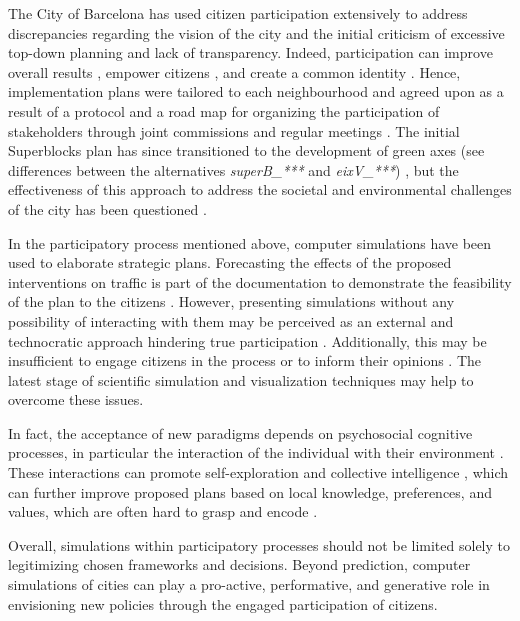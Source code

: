 The City of Barcelona has used citizen participation extensively to address discrepancies regarding the vision of the city and the initial criticism of excessive top-down planning and lack of transparency. Indeed, participation can improve overall results \citep{Washburn2013}, empower citizens \citep{Speer2001}, and create a common identity \citep{Campbell2000}. Hence, implementation plans were tailored to each neighbourhood and agreed upon as a result of a protocol and a road map for organizing the participation of stakeholders through joint commissions and regular meetings \citep{AjuntamentdeBarcelona2020implementingSuperblocks}. The initial Superblocks plan has since transitioned to the development of green axes (see differences between the alternatives \emph{superB\_***} and \emph{eixV\_***}) \citep{AjuntamentdeBarcelona2021SUPERBLOCKBCN}, but the effectiveness of this approach to address the societal and environmental challenges of the city has been questioned \citep{Sune2022,RuedaPalenzuela2022}.

In the participatory process mentioned above, computer simulations have been used to elaborate strategic plans. Forecasting the effects of the proposed interventions on traffic is part of the documentation to demonstrate the feasibility of the plan to the citizens \citep{AjuntamentdeBarcelona2019c,AjuntamentdeBarcelona2019b,AjuntamentdeBarcelona2013,AjuntamentdeBarcelona2018a,AjuntamentdeBarcelona2019a}. However, presenting simulations without any possibility of interacting with them may be perceived as an external and technocratic approach hindering true participation \citep{Pateman1970,Arnstein1969,ArgotaSanchez-Vaquerizo2018}. Additionally, this may be insufficient to engage citizens in the process or to inform their opinions \citep{Manzo2013}. The latest stage of scientific simulation and visualization techniques may help to overcome these issues.

In fact, the acceptance of new paradigms depends on psychosocial cognitive processes, in particular the interaction of the individual with their environment \citep{Marcheschi2022}. These interactions can promote self-exploration and collective intelligence \citep{Pan2016}, which can further improve proposed plans based on local knowledge, preferences, and values, which are often hard to grasp and encode \citep{Helbing2021}.

Overall, simulations within participatory processes should not be limited solely to legitimizing chosen frameworks and decisions. Beyond prediction, computer simulations of cities can play a pro-active, performative, and generative role in envisioning new policies through the engaged participation of citizens.


